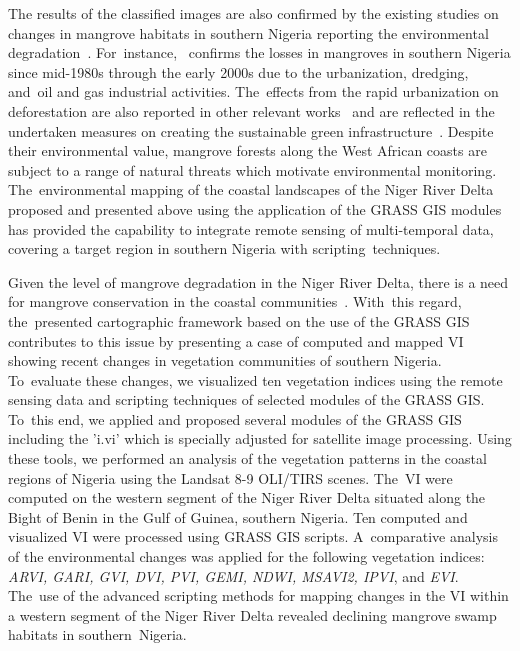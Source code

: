 \documentclass[jmse,article,accept,pdftex,moreauthors]{Definitions/mdpi}
\begin{document}
The results of the classified images are also confirmed by the existing studies on changes in mangrove habitats in southern Nigeria reporting the environmental degradation~\cite{BAMIDELE2023103274,TOBORE2022158}. For~instance,~\cite{Godstime2007} confirms the losses in mangroves in southern Nigeria since mid-1980s through the early 2000s due to the urbanization, dredging, and~oil and gas industrial activities. The~effects from the rapid urbanization on deforestation are also reported in other relevant works~\cite{AyanladeDrake,su141811289} and are reflected in the undertaken measures on creating the sustainable green infrastructure~\cite{ADEGUN2021e01044}. Despite their environmental value, mangrove forests along the West African coasts are subject to a range of natural threats which motivate environmental monitoring. The~environmental mapping of the coastal landscapes of the Niger River Delta proposed and presented above using the application of the GRASS GIS modules has provided the capability to integrate remote sensing of multi-temporal data, covering a target region in southern Nigeria with scripting~techniques. 

Given the level of mangrove degradation in the Niger River Delta, there is a need for mangrove conservation in the coastal communities~\cite{ONYENA2020e00961}. With~this regard, the~presented cartographic framework based on the use of the GRASS GIS contributes to this issue by presenting a case of computed and mapped VI showing recent changes in vegetation communities of southern Nigeria. To~evaluate these changes, we visualized ten vegetation indices using the remote sensing data and scripting techniques of selected modules of the GRASS GIS. To~this end, we applied and proposed several modules of the GRASS GIS including the 'i.vi' which is specially adjusted for satellite image processing. Using these tools, we performed an analysis of the vegetation patterns in the coastal regions of Nigeria using the Landsat 8-9 OLI/TIRS scenes. The~VI were computed on the western segment of the Niger River Delta situated along the Bight of Benin in the Gulf of Guinea, southern Nigeria. Ten computed and visualized VI were processed using GRASS GIS scripts. A~comparative analysis of the environmental changes was applied for the following vegetation indices: \emph{ARVI, GARI, GVI, DVI, PVI, GEMI, NDWI, MSAVI2, IPVI}, and \emph{EVI}. The~use of the advanced scripting methods for mapping changes in the VI within a western segment of the Niger River Delta revealed declining mangrove swamp habitats in southern~Nigeria. 
\end{document}
